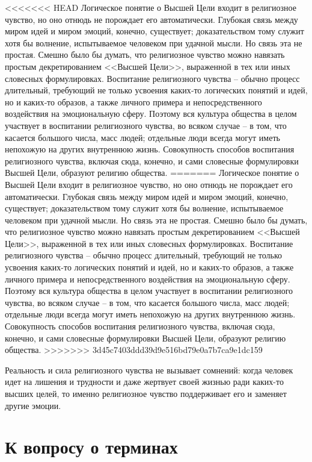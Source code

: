 \documentclass{book}
\begin{document}
<<<<<<< HEAD
Логическое понятие о Высшей Цели входит в религиозное чувство, но оно отнюдь не порождает его автоматически. Глубокая связь между миром идей и миром эмоций, конечно, существует; доказательством тому служит хотя бы волнение, испытываемое человеком при удачной мысли. Но связь эта не простая. Смешно было бы думать, что религиозное чувство можно навязать простым декретированием <<Высшей Цели>>, выраженной в тех или иных словесных формулировках. Воспитание религиозного чувства -- обычно процесс длительный, требующий не только усвоения каких‑то логических понятий и идей, но и каких‑то образов,  а также личного примера и непосредственного воздействия на эмоциональную сферу. Поэтому вся культура общества в целом участвует в воспитании религиозного чувства, во всяком случае -- в том, что касается боль­шого числа, масс людей; отдельные люди всегда могут иметь непохожую на других внутреннюю жизнь. Совокупность способов воспитания религиозного чувства, включая сюда, конечно, и сами словесные формулировки Высшей Цели, образуют рели­гию  общества.
=======
Логическое понятие о Высшей Цели входит в религиозное чувство, но оно отнюдь не порождает его автоматически. Глубокая связь между миром идей и миром эмоций, конечно, существует; доказательством тому служит хотя бы волнение, испытываемое человеком при удачной мысли. Но связь эта не простая. Смешно было бы думать, что религиозное чувство можно навязать простым декретированием <<Высшей Цели>>, выраженной в тех или иных словесных формулировках. Воспитание религиозного чувства -- обычно процесс длительный, требующий не только усвоения каких-то логических понятий и идей, но и каких-то образов,  а также личного примера и непосредственного воздействия на эмоциональную сферу. Поэтому вся культура общества в целом участвует в воспитании религиозного чувства, во всяком случае -- в том, что касается боль­шого числа, масс людей; отдельные люди всегда могут иметь непохожую на других внутреннюю жизнь. Совокупность способов воспитания религиозного чувства, включая сюда, конечно, и сами словесные формулировки Высшей Цели, 
образуют рели­гию  общества.
>>>>>>> 3d45c7403ddd39d9e516bd79e0a7b7ca9e1dc159

Реальность и сила религиозного чувства не вызывает сомне­ний: когда человек идет на лишения и трудности и даже жертвует своей жизнью ради каких-то высших целей, то именно религиозное чувство поддерживает его и заменяет другие эмоции.


\section{К вопросу о терминах}
\end{document}
